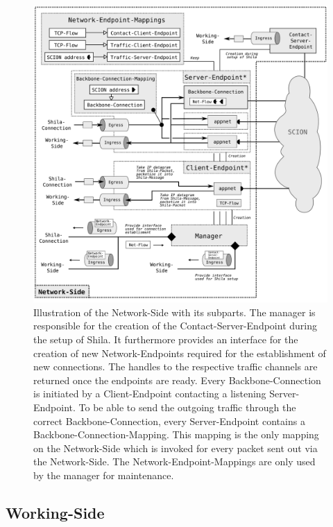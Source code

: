 \begin{figure} 
	\begin{center}
		\def\svgwidth{1\textwidth}
		\includegraphics[scale=0.2]{../illustrations/implementation/ModulesNetworkSide.pdf}   
		\caption[]{Illustration of the Network-Side with its subparts. The manager is responsible for the creation of the Contact-Server-Endpoint during the setup of Shila. It furthermore provides an interface for the creation of new Network-Endpoints required for the establishment of new connections. The handles to the respective traffic channels are returned once the endpoints are ready. Every Backbone-Connection is initiated by a Client-Endpoint contacting a listening Server-Endpoint. To be able to send the outgoing traffic through the correct Backbone-Connection, every Server-Endpoint contains a Backbone-Connection-Mapping. This mapping is the only mapping on the Network-Side which is invoked for every packet sent out via the Network-Side. The Network-Endpoint-Mappings are only used by the manager for maintenance.}
		\label{fig:ImplementationModulesNetworkSide}
	\end{center}
\end{figure}

\subsection*{Working-Side}

